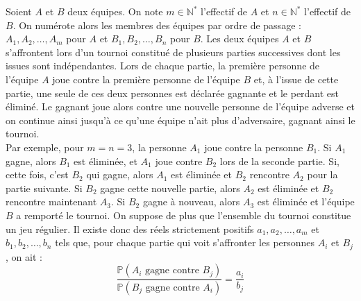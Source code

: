 \documentclass[landscape,twocolumn,leqno,a4paper,10pt]{report} %
\newcommand\n{\noindent}
\begin{document}
\n Soient $A$ et $B$ deux équipes. On note $m \in \mathbb{N}^{*}$ l'effectif de $A$ et $n \in \mathbb{N}^{*}$ l'effectif de $B$. On numérote alors les membres des équipes par ordre de passage : $A_{1}, A_{2}, \ldots, A_{m}$ pour $A$ et $B_{1}, B_{2}, \ldots, B_{n}$ pour $B$. Les deux équipes $A$ et $B$ s'affrontent lors d'un tournoi constitué de plusieurs parties successives dont les issues sont indépendantes. Lors de chaque partie, la première personne de l'équipe $A$ joue contre la première personne de l'équipe $B$ et, à l'issue de cette partie, une seule de ces deux personnes est déclarée gagnante et le perdant est éliminé. Le gagnant joue alors contre une nouvelle personne de l'équipe adverse et on continue ainsi jusqu'à ce qu'une équipe n'ait plus d'adversaire, gagnant ainsi le tournoi.\\
Par exemple, pour $m=n=3$, la personne $A_{1}$ joue contre la personne $B_{1}$. Si $A_{1}$ gagne, alors $B_{1}$ est éliminée, et $A_{1}$ joue contre $B_{2}$ lors de la seconde partie. Si, cette fois, c'est $B_{2}$ qui gagne, alors $A_{1}$ est éliminée et $B_{2}$ rencontre $A_{2}$ pour la partie suivante. Si $B_{2}$ gagne cette nouvelle partie, alors $A_{2}$ est éliminée et $B_{2}$ rencontre maintenant $A_{3}$. Si $B_{2}$ gagne à nouveau, alors $A_{3}$ est éliminée et l'équipe $B$ a remporté le tournoi. On suppose de plus que l'ensemble du tournoi constitue un jeu régulier. Il existe donc des réels strictement positifs $a_{1}, a_{2}, \ldots, a_{m}$ et $b_{1}, b_{2}, \ldots, b_{n}$ tels que, pour chaque partie qui voit s'affronter les personnes $A_{i}$ et $B_{j}$, on ait :
$$\frac{\mathbb{P}\left(A_{i} \text { gagne contre } B_{j}\right)}{\mathbb{P}\left(B_{j} \text { gagne contre } A_{i}\right)}=\frac{a_{i}}{b_{j}} $$
\end{document}
